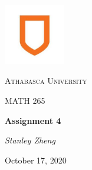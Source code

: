 \documentclass[11pt, letterpaper, twoside]{article}
\begin{document}
\begin{titlepage}
\centering
\vspace*{60px}
\hspace{0pt}
\includegraphics[width=0.2\textwidth]{logo}\par\vspace{1cm}
{\scshape\LARGE Athabasca University \par}
\vspace{1cm}
{\scshape\Large MATH 265\par}
\vspace{1.5cm}
{\huge\bfseries Assignment 4\par}
\vspace{2cm}
{\Large\itshape Stanley Zheng\par}
\vfill
{\large October 17, 2020\par}
\vspace*{50px}
\hspace{0pt}
\pagebreak
\end{titlepage}
\end{document}
